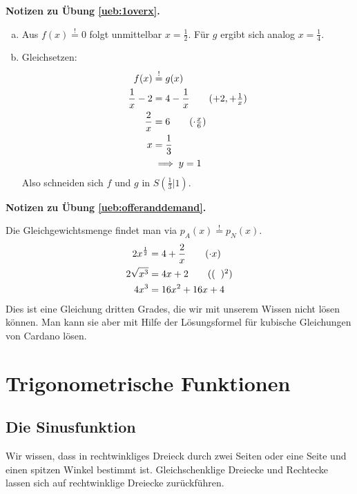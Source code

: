 \documentclass[%
11pt,%
twoside,%
titlepage,%
german,%
headsepline%
]{scrartcl}
\newcommand{\concatueb}[1]{ueb:#1}%
\newcommand{\concatlsg}[1]{lsg:#1}%
\newenvironment{lsg}[1]{%
    \par\noindent\textbf{Notizen zu Übung \ref{\concatueb{#1}}.}%
    \label{\concatlsg{#1}}
}{%
    \par%
}
\begin{document}
\begin{lsg}{1overx}
  \begin{enumerate}[a)]
    \item Aus $f(x)\stackrel{!}{=}0$ folgt unmittelbar $x=\frac{1}{2}$. Für $g$ ergibt sich analog $x=\frac{1}{4}$.
    \item Gleichsetzen:
    \begin{align*}
      f(x)&\stackrel{!}{=} g(x)\\
      \frac{1}{x}-2 &= 4-\frac{1}{x}\tag{$+2,+\frac{1}{x}$}\\
      \frac{2}{x} &= 6\tag{$\cdot\frac{x}{6}$}\\
      x &= \frac{1}{3}\\
      &\implies y=1
    \end{align*}
    Also schneiden sich $f$ und $g$ in $S(\frac{1}{3}|1)$.
  \end{enumerate}
\end{lsg}

\begin{lsg}{offeranddemand}
  Die Gleichgewichtsmenge findet man via $p_A(x)\stackrel{!}{=} p_N(x)$.
    \begin{align*}
      2x^\frac{1}{2} &= 4+\frac{2}{x}\tag{$\cdot x$}\\
      2\sqrt{x^3} &= 4x + 2\tag{$(\phantom{x})^2$}\\
      4x^3 &= 16x^2 +16x + 4
    \end{align*}
  Dies ist eine Gleichung dritten Grades, die wir mit unserem Wissen nicht lösen können. Man kann sie aber mit Hilfe der Lösungsformel für kubische Gleichungen von Cardano lösen.
\end{lsg}

\clearpage

\section{Trigonometrische Funktionen}

\subsection{Die Sinusfunktion}

Wir wissen, dass in rechtwinkliges Dreieck durch zwei Seiten oder eine Seite und einen spitzen Winkel bestimmt ist. Gleichschenklige Dreiecke und Rechtecke lassen sich auf rechtwinklige Dreiecke zurückführen.
\end{document}
